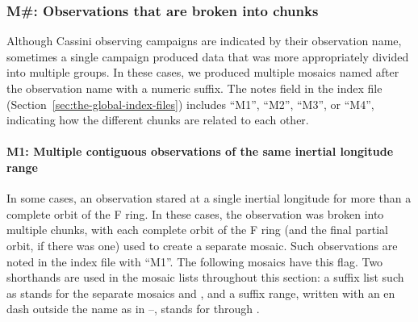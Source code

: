 \subsubsection{M\#: Observations that are broken into chunks}
\label{sec:m-observations-that-are-broken-into-chunks}

Although Cassini observing campaigns are indicated by their observation name, sometimes a single campaign produced data that was more appropriately divided into multiple groups. In these cases, we produced multiple mosaics named after the observation name with a numeric suffix. The notes field in the index file (Section~\ref{sec:the-global-index-files}) includes “M1”, “M2”, “M3”, or “M4”, indicating how the different chunks are related to each other.


\paragraph{M1: Multiple contiguous observations of the same inertial longitude range}
\label{sec:m1-multiple-contiguous-observations-of-the-same}

In some cases, an observation stared at a single inertial longitude for more than a complete orbit of the F ring. In these cases, the observation was broken into multiple chunks, with each complete orbit of the F ring (and the final partial orbit, if there was one) used to create a separate mosaic. Such observations are noted in the index file with “M1”. The following mosaics have this flag. Two shorthands are used in the mosaic lists throughout this section: a suffix list such as  stands for the separate mosaics  and , and a suffix range, written with an en dash outside the name as in –, stands for  through .

